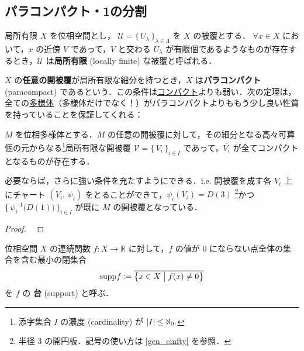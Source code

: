 \documentclass[geometry_main]{subfiles}
\begin{document}
\subsection{パラコンパクト・1の分割}

\begin{mydef}[label=def:locally-finite]{局所有限}
	$X$ を位相空間とし， $\mathcal{U} = \{\, U_\lambda \,\}_{\lambda \in \Lambda}$ を $X$ の被覆とする．
	$\forall x \in X$ において，$x$ の近傍 $V$ であって，$V$ と交わる $U_\lambda$ が有限個であるようなものが存在するとき，$\mathcal{U}$ は\textbf{局所有限} (locally finite) な被覆と呼ばれる．
\end{mydef}

$X$ の\textbf{任意の開被覆}が局所有限な細分を持つとき，$X$ は\textbf{パラコンパクト} (paracompact) であるという．この条件は\hyperref[def.compact]{コンパクト}よりも弱い．次の定理は，全ての\underline{多様体}（\cinfty 多様体だけでなく！）がパラコンパクトよりももう少し良い性質を持っていることを保証してくれる：

\begin{mytheo}[]{}
	$M$ を位相多様体とする．$M$ の任意の開被覆に対して，その細分となる高々可算個の元からなる\footnote{添字集合 $I$ の濃度 (cardinality) が $\abs{I} \le \aleph_0.$}局所有限な開被覆 $\mathcal{V} = \bigl\{\, V_i \,\bigr\}_{i \in I}$ であって，$\overline{V_i}$ が全てコンパクトとなるものが存在する．

	必要ならば，さらに強い条件を充たすようにできる．i.e. 開被覆を成す各 $V_i$ 上にチャート $(V_i,\, \psi_i)$ をとることができて，$\psi_i(V_i) = D(3)$ \footnote{半径 $3$ の開円板．記号の使い方は \ref{gen_cinfty} を参照．}かつ $\bigl\{\, \psi_i^{-1}\bigl(D(1)\bigr) \,\bigr\}_{i \in I}$ が既に $M$ の開被覆となっている．
\end{mytheo}

\begin{proof}
	~\cite[p.30, 命題1.29]{Morita}
\end{proof}


位相空間 $X$ の連続関数 $f \colon X \to \mathbb{R}$ に対して，$f$ の値が $0$ にならない点全体の集合を含む最小の閉集合
\begin{align} 
	\mathrm{supp} f \coloneqq \overline{\bigl\{ x \in X \bigm| f(x) \neq 0 \bigr\} }
\end{align}
を $f$ の \textbf{台} (support) と呼ぶ．
\end{document}
